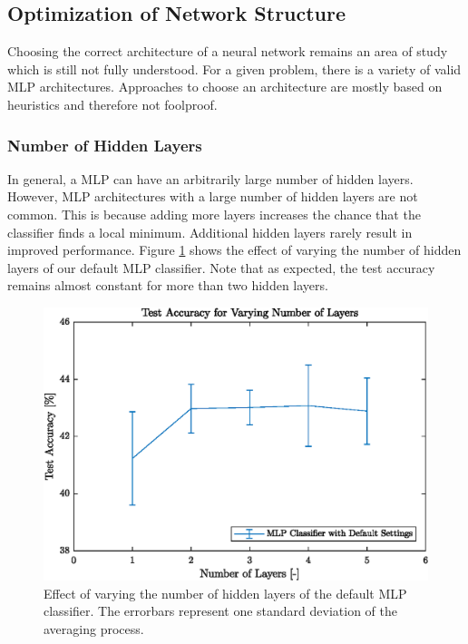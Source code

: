 \subsection{Optimization of Network Structure}\label{subsec:netStruct}

Choosing the correct architecture of a neural network remains an area of study which is still not fully understood\cite{andersen1999cross}. For a given problem, there is a variety of valid MLP architectures. Approaches to choose an architecture are mostly based on heuristics and therefore not foolproof\cite{andersen1999cross}.

\subsubsection{Number of Hidden Layers}

In general, a MLP can have an arbitrarily large number of hidden layers. However, MLP architectures with a large number of hidden layers are not common. This is because adding more layers increases the chance that the classifier finds a local minimum\cite{de1993backpropagation}. Additional hidden layers rarely result in improved performance. Figure \ref{fig:layers} shows the effect of varying the number of hidden layers of our default MLP classifier. Note that as expected, the test accuracy remains almost constant for more than two hidden layers.

\begin{figure}[h!]
    \centering
    \includegraphics{images/numberlayers}
    \caption{Effect of varying the number of hidden layers of the default MLP classifier. The errorbars represent one standard deviation of the averaging process.}
    \label{fig:layers}
 \end{figure}

